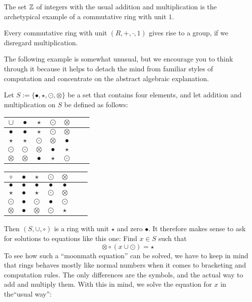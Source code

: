 \begin{example} The set $\mathbb{Z}$ of integers with the usual addition and multiplication is the archetypical example of a commutative ring with unit $1$.
\end{example}
\begin{example} Every commutative ring with unit $(R,+,\cdot,1)$ gives rise to a group, if we disregard multiplication.
\end{example}
The following example is somewhat unusual, but we encourage you to think through it because it helps to detach the mind from familiar styles of computation and concentrate on the abstract algebraic explanation.
\begin{example} Let $S:=\{\bullet,\star,\odot,\otimes\}$ be a set that contains four elements, and let addition and multiplication on $S$ be defined as follows:
\begin{center}
  \begin{tabular}{c | c c c c c c}
    $\cup$ & $\bullet$ & $\star$ & $\odot$ & $\otimes$ \\\hline
    $\bullet$ & $\bullet$ & $\star$ & $\odot$ & $\otimes$ \\
    $\star$ & $\star$ & $\odot$ & $\otimes$ & $\bullet$ \\
    $\odot$ & $\odot$ & $\otimes$ & $\bullet$ & $\star$ \\
    $\otimes$ & $\otimes$ & $\bullet$ & $\star$ & $\odot$ \\
  \end{tabular} \quad \quad \quad \quad
  \begin{tabular}{c | c c c c c c}
$ \circ $ & $\bullet$ & $\star$ & $\odot$ & $\otimes$ & \\\hline
        $\bullet$ & $\bullet$ & $\bullet$ & $\bullet$ & $\bullet$ &\\
        $\star$ & $\bullet$ & $\star$ & $\odot$ & $\otimes$ &\\
        $\odot$ & $\bullet$ & $\odot$ & $\bullet$ & $\odot$ &\\
        $\otimes$ & $\bullet$ & $\otimes$ & $\odot$ & $\star$ &\\
  \end{tabular}
\end{center}
Then $(S,\cup,\circ)$ is a ring with unit $\star$ and zero $\bullet$. It therefore makes sense to ask for solutions to equations like this one:
Find $x\in S$ such that
$$
\otimes \circ (x \cup \odot ) = \star
$$
To see how such a ``moonmath equation'' can be solved, we have to keep in mind that rings behaves mostly like normal numbers when it comes to bracketing and computation rules. The only differences are the symbols, and the actual way to add and multiply them. With this in mind, we solve the equation for $x$ in the``usual way'':

\end{example}
